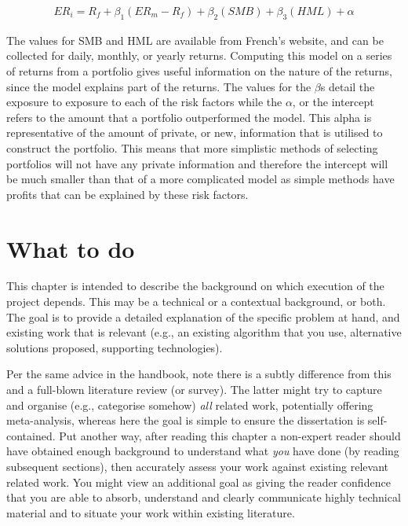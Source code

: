 \documentclass[ oneside,%
                    author={Joshua Felmeden},
                    degree={MEng},
                     title={Semantic Analysis of Financial Headlines Based on Realised Stock Returns},
                  subtitle={}]{dissertation}
\begin{document}
\begin{align*}
ER_i = R_f + \beta_1(ER_m -R_f) + \beta_2 (SMB) + \beta_3(HML) + \alpha
\end{align*}

The values for SMB and HML are available from French's website, and can be collected for daily, monthly, or yearly returns. Computing this model on a series of returns from a portfolio gives useful information on the nature of the returns, since the model explains part of the returns. The values for the $\beta$s detail the exposure to exposure to each of the risk factors while the $\alpha$, or the intercept refers to the amount that a portfolio outperformed the model. This alpha is representative of the amount of private, or new, information that is utilised to construct the portfolio. This means that more simplistic methods of selecting portfolios will not have any private information and therefore the intercept will be much smaller than that of a more complicated model as simple methods have profits that can be explained by these risk factors.


\section{What to do}
\noindent
This chapter is intended to describe the background on which execution of the project depends. This may be a technical or a contextual background, or both. The goal is to provide a detailed explanation of the specific problem at hand, and existing work that is relevant (e.g., an existing algorithm that you use, alternative solutions proposed, supporting technologies).  

Per the same advice in the handbook, note there is a subtly difference from this and a full-blown literature review (or survey).  The latter might try to capture and organise (e.g., categorise somehow) \emph{all} related work, potentially offering meta-analysis, whereas here the goal is simple to ensure the dissertation is self-contained.  Put another way, after reading this chapter a non-expert reader should have obtained enough background to understand what \emph{you} have done (by reading subsequent sections), then accurately assess your work against existing relevant related work.  You might view an additional goal as giving the reader confidence that you are able to absorb, understand and clearly communicate highly technical material and to situate your work within existing literature.
\end{document}
